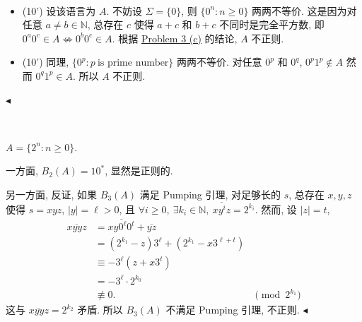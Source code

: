 ﻿\documentclass[11pt]{article}
\newenvironment{problem}[2][Problem]{\begin{trivlist}
\item[\hskip \labelsep {\bfseries #1}\hskip \labelsep {\bfseries #2.}]}{\hfill$\blacktriangleleft$\end{trivlist}}
\begin{document}
\begin{problem}{5 (20')} ~
    \begin{itemize}
        \item[(a)] (10') 设该语言为 $A$. 不妨设 $\Sigma=\{0\}$, 则 $\{0^n:n\ge 0\}$ 两两不等价. 这是因为对任意 $a\neq b\in\mathbb N$, 总存在 $c$ 使得 $a+c$ 和 $b+c$ 不同时是完全平方数, 即 $0^a0^c\in A\not\Leftrightarrow 0^b0^c\in A$. 根据 \underline{Problem 3 (c)} 的结论, $A$ 不正则.
        
        \item[(b)] (10') 同理, $\{0^p:p~\text{is prime number}\}$ 两两不等价. 对任意 $0^p$ 和 $0^q$, $0^p1^p\notin A$ 然而 $0^q1^p\in A$. 所以 $A$ 不正则.
    \end{itemize}
\end{problem}

\begin{problem}{6 (10')} ~

    \qquad $A=\{2^n:n\ge 0\}$.

    \qquad 一方面, $B_2(A)=10^*$, 显然是正则的.

    \qquad 另一方面, 反证, 如果 $B_3(A)$ 满足 Pumping 引理, 对足够长的 $s$, 总存在 $x,y,z$ 使得 $s=xyz$, $|y|=\ell>0$, 且 $\forall i\ge 0,~\exists k_i\in\mathbb N,~\overline{xy^iz}=2^{k_i}$. 然而, 设 $|z|=t$,
    $$
        \begin{aligned}
            \overline{xyyz} &= \overline{xy0^\ell0^t}+\overline{yz}\\
            &= (2^{k_1}-z)3^\ell+(2^{k_1}-x3^{\ell+t})\\
            &\equiv -3^\ell(z+x3^t)\\
            &= -3^\ell\cdot 2^{k_0}\\
            &\not\equiv 0. &\pmod {2^{k_1}}
        \end{aligned}
    $$
    这与 $\overline{xyyz}=2^{k_2}$ 矛盾. 所以 $B_3(A)$ 不满足 Pumping 引理, 不正则.
\end{problem}
\end{document}
